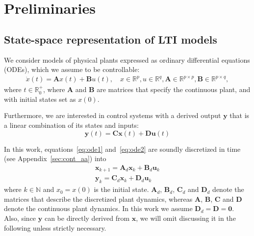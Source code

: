 \documentclass[sigconf]{llncs}
\newcommand{\mat}[1]{\boldsymbol{#1}}
\renewcommand{\vec}[1]{\boldsymbol{#1}}
\begin{document}
\section{Preliminaries}
\label{sec:preliminaries}

\subsection{State-space representation of LTI models}
\label{sec:ssrepresentation}


We consider models of physical plants expressed as ordinary differential
equations (ODEs), which we assume to be controllable:
%
\begin{align}
\label{eq:ode1}
\dot{x}(t) = \mat{A}x(t)+ \mat{B} u(t), \quad x \in \mathbb{R}^p, u \in \mathbb{R}^q, \mat{A} \in \mathbb{R}^{p \times p}, \mat{B} \in \mathbb{R}^{p \times q},
\end{align}
%
where $t \in \mathbb R_0^+$, where $\mat{A}$ and $\mat{B}$ are matrices that 
specify the continuous plant, and with initial states set as $x(0)$.

Furthermore, we are interested in control systems with a derived
output $\vec{y}$ that is a linear combination of its states and inputs:
\begin{equation}
\label{eq:ode2}  
\vec{y}(t)=\mat{C}\vec{x}(t)+\mat{D}\vec{u}(t)
\end{equation}

In this work, equations~\eqref{eq:ode1} and~\eqref{eq:ode2} are soundly discretized in time (see Appendix~\ref{sec:cont_aa})  into
\begin{align}
\label{eq:plant}
\vec{x}_{k+1} = \mat{A}_d \vec{x}_k+ \mat{B}_d \vec{u}_k\\
\vec{y}_{k} = \mat{C}_d \vec{x}_k + \mat{D}_d \vec{u}_k
\end{align} 
%
where $k \in \mathbb N$ and $x_{0}=x(0)$ is the initial state. 
$\mat{A}_d$, $\mat{B}_d$, $\mat{C}_d$ and $\mat{D}_d$ denote the matrices that describe the discretized plant dynamics, whereas $\mat{A}$, $\mat{B}$, $\mat{C}$ and $\mat{D}$ denote the continuous plant dynamics.  In this work we assume $\mat{D}_d=\mat{D}=\mat{0}$. Also, since $\vec{y}$ can be directly derived from $\vec{x}$, we will omit discussing it in the following unless strictly necessary.
\end{document}
